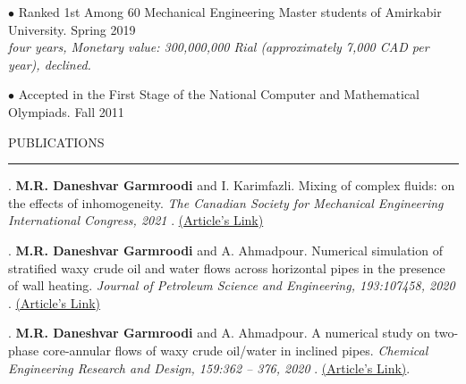 \documentclass[10.5pt]{article}
\begin{document}
	{\noindent $\bullet$ Ranked 1st Among 60 Mechanical Engineering Master students of Amirkabir University.} \hfill {Spring 2019} 
	\\ \textit{four years, Monetary value: 300,000,000 Rial (approximately 7,000 CAD per year), declined.}
	\vspace{1.5mm}
	
	{\noindent $\bullet$ Accepted in the First Stage of the National Computer and Mathematical Olympiads.} \hfill {Fall 2011} 
	\vspace{1.5mm}
			
			
			 \vspace{2.5mm}
			 
			 \noindent PUBLICATIONS
			 
			 \vspace{-2mm}
			 
			 \noindent\rule[0.5ex]{\linewidth}{1pt}
		
	
			
		. {\textbf{M.R. Daneshvar Garmroodi} and I. Karimfazli. Mixing of complex fluids: on the effects of inhomogeneity.\textit{ The Canadian Society for Mechanical Engineering International Congress, 2021} .
		\href{https://library.upei.ca/islandora/object/csme2021\%3A18/datastream/PDF/download/csme2021\%3A18.pdf}{({Article's Link})}}
		
		. {\textbf{M.R. Daneshvar Garmroodi} and A. Ahmadpour. Numerical simulation of stratified waxy crude oil and water flows across horizontal pipes in the presence of wall heating.\textit{ Journal of Petroleum Science and Engineering, 193:107458, 2020} . \href{https://www.sciencedirect.com/science/article/pii/S0920410520305295?casa_token=OMdAt0Hgt7oAAAAA:CxTTdlrFtpNTO3ZNe9jSEKOEc4iqD2lS5xVr-1FB0PAFSTMdcy_EblsQULZ0ZE2Oa_S_li90D4U}{({Article's Link})}}
		
		. {\textbf{M.R. Daneshvar Garmroodi} and A. Ahmadpour. A numerical study on two-phase core-annular flows of waxy crude oil/water in inclined pipes.\textit{ Chemical Engineering Research and Design, 159:362
				– 376, 2020} . \href{https://www.sciencedirect.com/science/article/abs/pii/S0263876220301696}{({Article's Link})}}.
			
\end{document}
